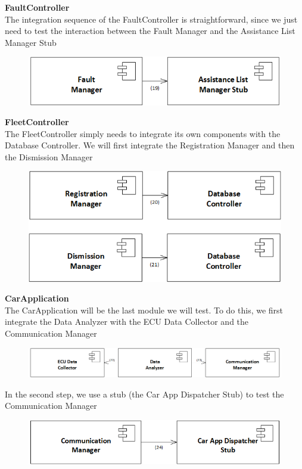 \documentclass{article}
\begin{document}
\textbf{FaultController}
\\
The integration sequence of the FaultController is straightforward, since we just need to test the interaction between the Fault Manager and the Assistance List Manager Stub
\begin{figure}[H]
\includegraphics[scale=0.5]{FaultController/FaultController}
\centering
\end{figure}
\textbf{FleetController}
\\
The FleetController simply needs to integrate its own components with the Database Controller. We will first integrate the Registration Manager and then the Dismission Manager
\begin{figure}[H]
\includegraphics[scale=0.5]{FleetController/FleetController}
\centering
\end{figure}
\textbf{CarApplication}
\\
The CarApplication will be the last module we will test. To do this, we first integrate the Data Analyzer with the ECU Data Collector and the Communication Manager
\begin{figure}[H]
\includegraphics[scale=0.5]{CarApplication/CarApplication1}
\centering
\end{figure}
In the second step, we use a stub (the Car App Dispatcher Stub) to test the Communication Manager
\begin{figure}[H]
\includegraphics[scale=0.5]{CarApplication/CarApplication2}
\centering
\end{figure}
\end{document}
